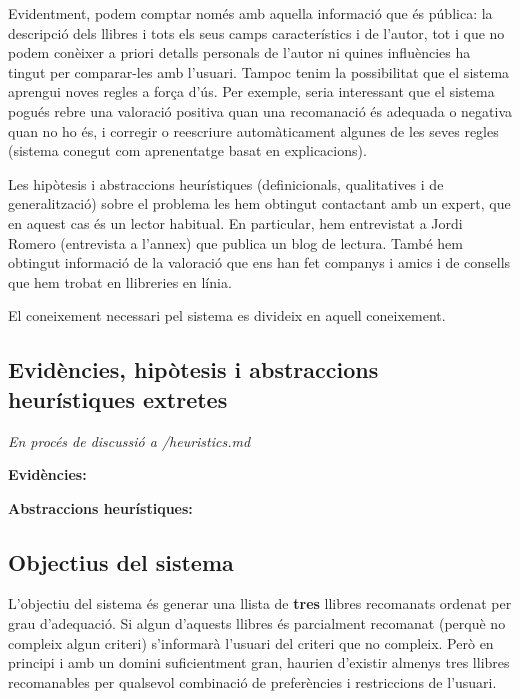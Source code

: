 Evidentment, podem comptar només amb aquella informació que és pública: la descripció dels llibres i tots els seus camps característics i de l'autor, tot i que no podem conèixer a priori detalls personals de l'autor ni quines influències ha tingut per comparar-les amb l'usuari. Tampoc tenim la possibilitat que el sistema aprengui noves regles a força d'ús. Per exemple, seria interessant que el sistema pogués rebre una valoració positiva quan una recomanació és adequada o negativa quan no ho és, i corregir o reescriure automàticament algunes de les seves regles (sistema conegut com aprenentatge basat en explicacions).

Les hipòtesis i abstraccions heurístiques (definicionals, qualitatives i de generalització) sobre el problema les hem obtingut contactant amb un expert, que en aquest cas és un lector habitual. En particular, hem entrevistat a Jordi Romero (entrevista a l'annex) que publica un blog de lectura. També hem obtingut informació de la valoració que ens han fet companys i amics i de consells que hem trobat en llibreries en línia.

El coneixement necessari pel sistema es divideix en aquell coneixement.


\subsection{Evidències, hipòtesis i abstraccions heurístiques extretes}

\emph{En procés de discussió a /heuristics.md}

\textbf{Evidències: }

\textbf{Abstraccions heurístiques: }



\subsection{Objectius del sistema}

L'objectiu del sistema és generar una llista de \textbf{tres} llibres recomanats ordenat per grau d'adequació. Si algun d'aquests llibres és parcialment recomanat (perquè no compleix algun criteri) s'informarà l'usuari del criteri que no compleix. Però en principi i amb un domini suficientment gran, haurien d'existir almenys tres llibres recomanables per qualsevol combinació de preferències i restriccions de l'usuari.





